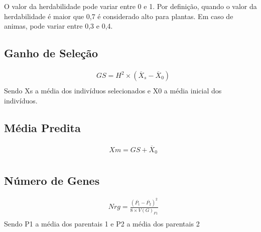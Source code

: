 O valor da herdabilidade pode variar entre 0 e 1. Por definição, quando o valor da herdabilidade é maior que 0,7 é considerado alto para plantas. Em caso de animas, pode variar entre 0,3 e 0,4.



\subsection{Ganho de Seleção}

\begin{definition}

\begin{align}
& GS = H^2 \times (\overline{X}_s - \overline{X}_0) \\
\end{align}
Sendo Xs a média dos indivíduos selecionados e X0 a média inicial dos indivíduos.
\end{definition}


\subsection{Média Predita}

\begin{definition}

\begin{align}
& Xm = GS + \overline{X}_0 \\
\end{align}
\end{definition}


\subsection{Número de Genes}


\begin{definition}

\begin{align}
& Nrg = \frac{(\overline{P_1} - \overline{P_2})^2}{8 \times V(G)_{F1}} \\
\end{align}
Sendo P1 a média dos parentais 1 e  P2 a média dos parentais 2 
\end{definition}

